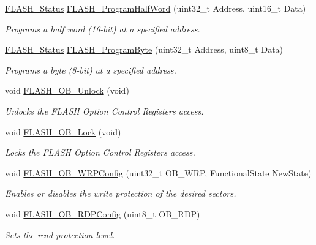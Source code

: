 \begin{DoxyCompactItemize}
\hyperlink{group___f_l_a_s_h_gadc63a6f3404ff1f71229a66915e9cdc0}{F\-L\-A\-S\-H\-\_\-\-Status} \hyperlink{group___f_l_a_s_h_ga5c1336f667950a8765887228f1d0d501}{F\-L\-A\-S\-H\-\_\-\-Program\-Half\-Word} (uint32\-\_\-t Address, uint16\-\_\-t Data)
\begin{DoxyCompactList}\small\item\em Programs a half word (16-\/bit) at a specified address. \end{DoxyCompactList}\item 
\hyperlink{group___f_l_a_s_h_gadc63a6f3404ff1f71229a66915e9cdc0}{F\-L\-A\-S\-H\-\_\-\-Status} \hyperlink{group___f_l_a_s_h_gac425adf52fe7f229ef6bb893fe386848}{F\-L\-A\-S\-H\-\_\-\-Program\-Byte} (uint32\-\_\-t Address, uint8\-\_\-t Data)
\begin{DoxyCompactList}\small\item\em Programs a byte (8-\/bit) at a specified address. \end{DoxyCompactList}\item 
void \hyperlink{group___f_l_a_s_h_ga518d6e3bbba2adf1523e8454f62348e9}{F\-L\-A\-S\-H\-\_\-\-O\-B\-\_\-\-Unlock} (void)
\begin{DoxyCompactList}\small\item\em Unlocks the F\-L\-A\-S\-H Option Control Registers access. \end{DoxyCompactList}\item 
void \hyperlink{group___f_l_a_s_h_ga63a33d9af7e29b64c3806e5505c59b74}{F\-L\-A\-S\-H\-\_\-\-O\-B\-\_\-\-Lock} (void)
\begin{DoxyCompactList}\small\item\em Locks the F\-L\-A\-S\-H Option Control Registers access. \end{DoxyCompactList}\item 
void \hyperlink{group___f_l_a_s_h_gaffe7e91bcce65ac079ae5afa1db568b5}{F\-L\-A\-S\-H\-\_\-\-O\-B\-\_\-\-W\-R\-P\-Config} (uint32\-\_\-t O\-B\-\_\-\-W\-R\-P, Functional\-State New\-State)
\begin{DoxyCompactList}\small\item\em Enables or disables the write protection of the desired sectors. \end{DoxyCompactList}\item 
void \hyperlink{group___f_l_a_s_h_ga12cb6799f725a49cd151eef4d6d1789b}{F\-L\-A\-S\-H\-\_\-\-O\-B\-\_\-\-R\-D\-P\-Config} (uint8\-\_\-t O\-B\-\_\-\-R\-D\-P)
\begin{DoxyCompactList}\small\item\em Sets the read protection level. \end{DoxyCompactList}\item 

\end{DoxyCompactItemize}
